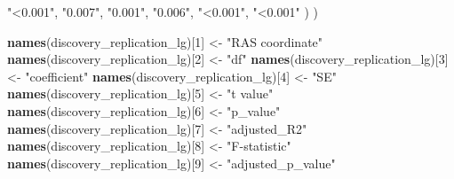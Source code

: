 \documentclass[
]{article}
\newenvironment{Shaded}{\begin{snugshade}}{\end{snugshade}}
\newcommand{\DecValTok}[1]{\textcolor[rgb]{0.00,0.00,0.81}{#1}}
\newcommand{\KeywordTok}[1]{\textcolor[rgb]{0.13,0.29,0.53}{\textbf{#1}}}
\newcommand{\NormalTok}[1]{#1}
\newcommand{\StringTok}[1]{\textcolor[rgb]{0.31,0.60,0.02}{#1}}
\begin{document}
\begin{Shaded}
\begin{Highlighting}[]
                                        \StringTok{"<0.001"}\NormalTok{, }\StringTok{"0.007"}\NormalTok{, }\StringTok{"0.001"}\NormalTok{, }\StringTok{"0.006"}\NormalTok{, }\StringTok{"<0.001"}\NormalTok{, }\StringTok{"<0.001"}
\NormalTok{                                        )}
\NormalTok{                )}

\KeywordTok{names}\NormalTok{(discovery_replication_lg)[}\DecValTok{1}\NormalTok{] <-}\StringTok{ "RAS coordinate"}
\KeywordTok{names}\NormalTok{(discovery_replication_lg)[}\DecValTok{2}\NormalTok{] <-}\StringTok{ "df"}
\KeywordTok{names}\NormalTok{(discovery_replication_lg)[}\DecValTok{3}\NormalTok{] <-}\StringTok{ "coefficient"}
\KeywordTok{names}\NormalTok{(discovery_replication_lg)[}\DecValTok{4}\NormalTok{] <-}\StringTok{ "SE"}
\KeywordTok{names}\NormalTok{(discovery_replication_lg)[}\DecValTok{5}\NormalTok{] <-}\StringTok{ "t value"}
\KeywordTok{names}\NormalTok{(discovery_replication_lg)[}\DecValTok{6}\NormalTok{] <-}\StringTok{ "p_value"}
\KeywordTok{names}\NormalTok{(discovery_replication_lg)[}\DecValTok{7}\NormalTok{] <-}\StringTok{ "adjusted_R2"}
\KeywordTok{names}\NormalTok{(discovery_replication_lg)[}\DecValTok{8}\NormalTok{] <-}\StringTok{ "F-statistic"}
\KeywordTok{names}\NormalTok{(discovery_replication_lg)[}\DecValTok{9}\NormalTok{] <-}\StringTok{ "adjusted_p_value"}


\end{Highlighting}
\end{Shaded}
\end{document}
